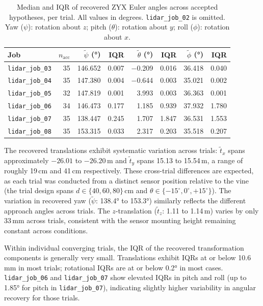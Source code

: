 \begin{table}[htbp]
  \centering
  \caption{Median and IQR of recovered ZYX Euler angles across accepted hypotheses, per trial. All values in degrees. \texttt{lidar\_job\_02} is omitted. Yaw ($\psi$): rotation about $z$; pitch ($\theta$): rotation about $y$; roll ($\phi$): rotation about $x$.}
  \label{tab:pa-results-rotation}
  \begin{tabularx}{\textwidth}{l r r r r r r r}
    \toprule
    \textbf{Job} &
    \boldmath$n_\text{acc}$ &
    \boldmath$\tilde{\psi}$ \textbf{(°)} &
    \textbf{IQR} &
    \boldmath$\tilde{\theta}$ \textbf{(°)} &
    \textbf{IQR} &
    \boldmath$\tilde{\phi}$ \textbf{(°)} &
    \textbf{IQR} \\
    \midrule
    \texttt{lidar\_job\_03} & 35 & 146.652 & 0.007 & $-$0.209 & 0.016 & 36.418 & 0.040 \\
    \texttt{lidar\_job\_04} & 35 & 147.380 & 0.004 & $-$0.644 & 0.003 & 35.021 & 0.002 \\
    \texttt{lidar\_job\_05} & 32 & 147.819 & 0.001 &    3.993 & 0.003 & 36.363 & 0.001 \\
    \texttt{lidar\_job\_06} & 34 & 146.473 & 0.177 &    1.185 & 0.939 & 37.932 & 1.780 \\
    \texttt{lidar\_job\_07} & 35 & 138.447 & 0.245 &    1.707 & 1.847 & 36.531 & 1.553 \\
    \texttt{lidar\_job\_08} & 35 & 153.315 & 0.033 &    2.317 & 0.203 & 35.518 & 0.207 \\
    \bottomrule
  \end{tabularx}
\end{table}

The recovered translations exhibit systematic variation across trials: $\tilde{t}_x$ spans approximately $-26.01$ to $-26.20$\,m and $\tilde{t}_y$ spans 15.13 to 15.54\,m, a range of roughly 19\,cm and 41\,cm respectively. These cross-trial differences are expected, as each trial was conducted from a distinct sensor position relative to the vine (the trial design spans $d \in \{40, 60, 80\}$\,cm and $\theta \in \{-15^{\circ}, 0^{\circ}, +15^{\circ}\}$). The variation in recovered yaw ($\tilde{\psi}$: 138.4° to 153.3°) similarly reflects the different approach angles across trials. The $z$-translation ($\tilde{t}_z$: 1.11 to 1.14\,m) varies by only 33\,mm across trials, consistent with the sensor mounting height remaining constant across conditions.

Within individual converging trials, the IQR of the recovered transformation components is generally very small. Translations exhibit IQRs at or below 10.6\,mm in most trials; rotational IQRs are at or below 0.2° in most cases. \texttt{lidar\_job\_06} and \texttt{lidar\_job\_07} show elevated IQRs in pitch and roll (up to 1.85° for pitch in \texttt{lidar\_job\_07}), indicating slightly higher variability in angular recovery for those trials.

